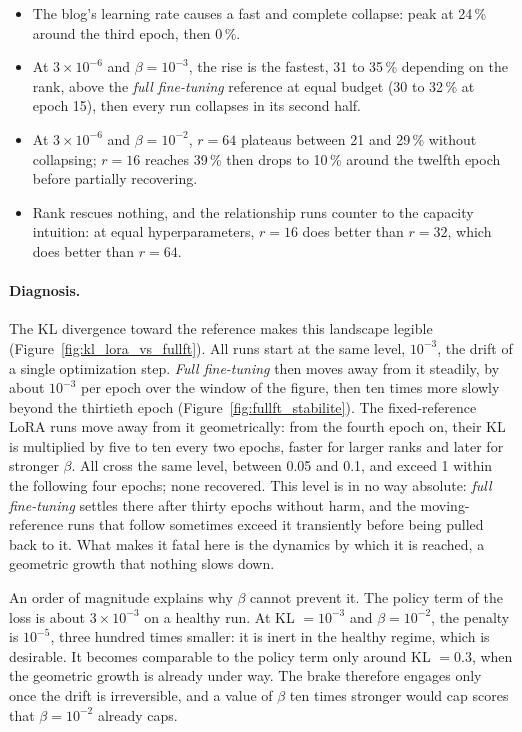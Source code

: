 \documentclass[11pt,a4paper]{article}
\begin{document}
\begin{itemize}
    \item The blog's learning rate causes a fast and complete collapse: peak at 24\,\% around the third epoch, then 0\,\%.
    \item At $3 \times 10^{-6}$ and $\beta = 10^{-3}$, the rise is the fastest, 31 to 35\,\% depending on the rank, above the \emph{full fine-tuning} reference at equal budget (30 to 32\,\% at epoch 15), then every run collapses in its second half.
    \item At $3 \times 10^{-6}$ and $\beta = 10^{-2}$, $r=64$ plateaus between 21 and 29\,\% without collapsing; $r=16$ reaches 39\,\% then drops to 10\,\% around the twelfth epoch before partially recovering.
    \item Rank rescues nothing, and the relationship runs counter to the capacity intuition: at equal hyperparameters, $r=16$ does better than $r=32$, which does better than $r=64$.
\end{itemize}

\paragraph{Diagnosis.} The KL divergence toward the reference makes this landscape legible (Figure~\ref{fig:kl_lora_vs_fullft}). All runs start at the same level, $10^{-3}$, the drift of a single optimization step. \emph{Full fine-tuning} then moves away from it steadily, by about $10^{-3}$ per epoch over the window of the figure, then ten times more slowly beyond the thirtieth epoch (Figure~\ref{fig:fullft_stabilite}). The fixed-reference LoRA runs move away from it geometrically: from the fourth epoch on, their KL is multiplied by five to ten every two epochs, faster for larger ranks and later for stronger $\beta$. All cross the same level, between 0.05 and 0.1, and exceed 1 within the following four epochs; none recovered. This level is in no way absolute: \emph{full fine-tuning} settles there after thirty epochs without harm, and the moving-reference runs that follow sometimes exceed it transiently before being pulled back to it. What makes it fatal here is the dynamics by which it is reached, a geometric growth that nothing slows down. 





An order of magnitude explains why $\beta$ cannot prevent it. The policy term of the loss is about $3 \times 10^{-3}$ on a healthy run. At KL $= 10^{-3}$ and $\beta = 10^{-2}$, the penalty is $10^{-5}$, three hundred times smaller: it is inert in the healthy regime, which is desirable. It becomes comparable to the policy term only around KL $= 0.3$, when the geometric growth is already under way. The brake therefore engages only once the drift is irreversible, and a value of $\beta$ ten times stronger would cap scores that $\beta = 10^{-2}$ already caps.
\end{document}

